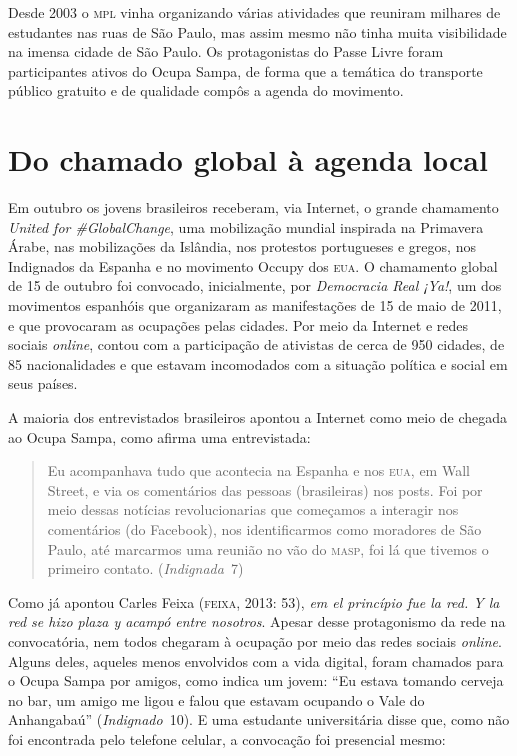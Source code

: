 Desde 2003 o \textsc{mpl} vinha organizando várias atividades que reuniram
milhares de estudantes nas ruas de São Paulo, mas assim mesmo não tinha
muita visibilidade na imensa cidade de São Paulo. Os
protagonistas do Passe Livre foram participantes ativos do Ocupa
Sampa, de forma que a temática do transporte público gratuito e de
qualidade compôs a agenda do movimento.

\section{Do chamado global à agenda local}

Em outubro os jovens brasileiros receberam, via Internet, o grande
chamamento \textit{United for \#GlobalChange}, uma mobilização mundial
inspirada na Primavera Árabe, nas mobilizações da Islândia, nos
protestos portugueses e gregos, nos Indignados da Espanha e no movimento
Occupy dos \textsc{eua}. O chamamento global de 15 de outubro foi convocado,
inicialmente, por \textit{Democracia Real ¡Ya!}, um dos
movimentos espanhóis que organizaram as manifestações de 15 de maio de
2011, e que provocaram as ocupações pelas cidades. Por meio da
Internet e redes sociais \textit{online}, contou com a participação de ativistas
de cerca de 950 cidades, de 85 nacionalidades e que estavam
incomodados com a situação política e social em seus países.

A maioria dos entrevistados brasileiros apontou a Internet como
meio de chegada ao Ocupa Sampa, como afirma uma entrevistada:

\begin{quote}
Eu acompanhava tudo que acontecia na Espanha e nos \textsc{eua}, em Wall Street,
e via os comentários das pessoas (brasileiras) nos posts. Foi por meio
dessas notícias revolucionarias que começamos a interagir nos
comentários (do Facebook), nos identificarmos como moradores de São
Paulo, até marcarmos uma reunião no vão do \textsc{masp}, foi lá que tivemos o
primeiro contato. (\textit{Indignada}~7)
\end{quote}

Como já apontou Carles Feixa (\textsc{feixa}, 2013: 53), \textit{em el princípio fue la
red. Y la red se hizo plaza y acampó entre nosotros}. Apesar desse
protagonismo da rede na convocatória, nem todos chegaram à ocupação por
meio das redes sociais \textit{online}. Alguns deles, aqueles menos
envolvidos com a vida digital, foram chamados para o Ocupa Sampa por
amigos, como indica um jovem: ``Eu estava tomando cerveja no bar, um
amigo me ligou e falou que estavam ocupando o Vale do Anhangabaú''
(\textit{Indignado}~10). E uma estudante universitária disse que, como não foi
encontrada pelo telefone celular, a convocação foi presencial mesmo:

